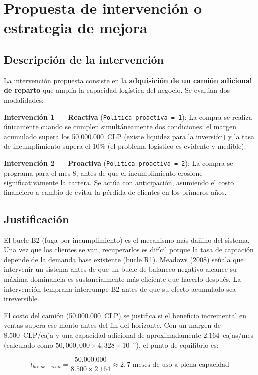 \documentclass[10pt,a4paper]{article}
\begin{document}
\section{Propuesta de intervención o estrategia de mejora}

\subsection{Descripción de la intervención}

La intervención propuesta consiste en la \textbf{adquisición de un camión adicional de reparto} que amplía la capacidad logística del negocio. Se evalúan dos modalidades:

\textbf{Intervención 1 --- Reactiva} (\texttt{Politica proactiva = 1}): La compra se realiza únicamente cuando se cumplen simultáneamente dos condiciones: el margen acumulado supera los 50.000.000~CLP (existe liquidez para la inversión) y la tasa de incumplimiento supera el 10\% (el problema logístico es evidente y medible).

\textbf{Intervención 2 --- Proactiva} (\texttt{Politica proactiva = 2}): La compra se programa para el mes 8, antes de que el incumplimiento erosione significativamente la cartera. Se actúa con anticipación, asumiendo el costo financiero a cambio de evitar la pérdida de clientes en los primeros años.

\subsection{Justificación}

El bucle B2 (fuga por incumplimiento) es el mecanismo más dañino del sistema. Una vez que los clientes se van, recuperarlos es difícil porque la tasa de captación depende de la demanda base existente (bucle R1). Meadows (2008) señala que intervenir un sistema antes de que un bucle de balanceo negativo alcance su máxima dominancia es sustancialmente más eficiente que hacerlo después. La intervención temprana interrumpe B2 antes de que su efecto acumulado sea irreversible.

El costo del camión (50.000.000~CLP) se justifica si el beneficio incremental en ventas supera ese monto antes del fin del horizonte. Con un margen de 8.500~CLP/caja y una capacidad adicional de aproximadamente 2.164~cajas/mes (calculado como $50{,}000{,}000 \times 4{,}328 \times 10^{-5}$), el punto de equilibrio es:

\begin{equation}
t_{break-even} = \frac{50{.}000{.}000}{8{.}500 \times 2{.}164} \approx 2{,}7 \text{ meses de uso a plena capacidad}
\end{equation}
\end{document}
